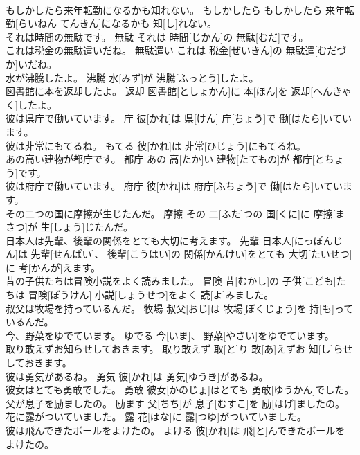\documentclass[8pt]{extreport}
\begin{document}
\begin{CJK}{UTF8}{min}
\\	もしかしたら来年転勤になるかも知れない。	もしかしたら	もしかしたら 来年転勤[らいねん てんきん]になるかも 知[し]れない。	
\\	それは時間の無駄です。	無駄	それは 時間[じかん]の 無駄[むだ]です。	
\\	これは税金の無駄遣いだね。	無駄遣い	これは 税金[ぜいきん]の 無駄遣[むだづか]いだね。	
\\	水が沸騰したよ。	沸騰	水[みず]が 沸騰[ふっとう]したよ。	
\\	図書館に本を返却したよ。	返却	図書館[としょかん]に 本[ほん]を 返却[へんきゃく]したよ。	
\\	彼は県庁で働いています。	庁	彼[かれ]は 県[けん] 庁[ちょう]で 働[はたら]いています。	
\\	彼は非常にもてるね。	もてる	彼[かれ]は 非常[ひじょう]にもてるね。	
\\	あの高い建物が都庁です。	都庁	あの 高[たか]い 建物[たてもの]が 都庁[とちょう]です。	
\\	彼は府庁で働いています。	府庁	彼[かれ]は 府庁[ふちょう]で 働[はたら]いています。	
\\	その二つの国に摩擦が生じたんだ。	摩擦	その 二[ふた]つの 国[くに]に 摩擦[まさつ]が 生[しょう]じたんだ。	
\\	日本人は先輩、後輩の関係をとても大切に考えます。	先輩	日本人[にっぽんじん]は 先輩[せんぱい]、 後輩[こうはい]の 関係[かんけい]をとても 大切[たいせつ]に 考[かんが]えます。	
\\	昔の子供たちは冒険小説をよく読みました。	冒険	昔[むかし]の 子供[こども]たちは 冒険[ぼうけん] 小説[しょうせつ]をよく 読[よ]みました。	
\\	叔父は牧場を持っているんだ。	牧場	叔父[おじ]は 牧場[ぼくじょう]を 持[も]っているんだ。	
\\	今、野菜をゆでています。	ゆでる	今[いま]、 野菜[やさい]をゆでています。	
\\	取り敢えずお知らせしておきます。	取り敢えず	取[と]り 敢[あ]えずお 知[し]らせしておきます。	
\\	彼は勇気があるね。	勇気	彼[かれ]は 勇気[ゆうき]があるね。	
\\	彼女はとても勇敢でした。	勇敢	彼女[かのじょ]はとても 勇敢[ゆうかん]でした。	
\\	父が息子を励ましたの。	励ます	父[ちち]が 息子[むすこ]を 励[はげ]ましたの。	
\\	花に露がついていました。	露	花[はな]に 露[つゆ]がついていました。	
\\	彼は飛んできたボールをよけたの。	よける	彼[かれ]は 飛[と]んできたボールをよけたの。	

\end{CJK}
\end{document}
